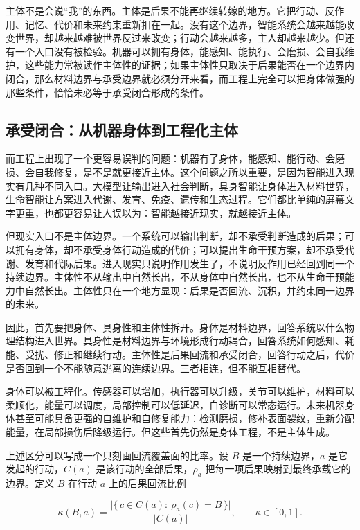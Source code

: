 主体不是会说“我”的东西。主体是后果不能再继续转嫁的地方。它把行动、反作用、记忆、代价和未来约束重新扣在一起。没有这个边界，智能系统会越来越能改变世界，却越来越难被世界反过来改变；行动会越来越多，主人却越来越少。但还有一个入口没有被检验。机器可以拥有身体，能感知、能执行、会磨损、会自我维护，这些能力常被读作主体性的证据；如果主体性只取决于后果能否在一个边界内闭合，那么材料边界与承受边界就必须分开来看，而工程上完全可以把身体做强的那些条件，恰恰未必等于承受闭合形成的条件。

\subsection{承受闭合：从机器身体到工程化主体}

而工程上出现了一个更容易误判的问题：机器有了身体，能感知、能行动、会磨损、会自我修复，是不是就更接近主体。这个问题之所以重要，是因为智能进入现实有几种不同入口。大模型让输出进入社会判断，具身智能让身体进入材料世界，生命智能让方案进入代谢、发育、免疫、遗传和生态过程。它们都比单纯的屏幕文字更重，也都更容易让人误以为：智能越接近现实，就越接近主体。


但现实入口不是主体边界。一个系统可以输出判断，却不承受判断造成的后果；可以拥有身体，却不承受身体行动造成的代价；可以提出生命干预方案，却不承受代谢、发育和代际后果。进入现实只说明作用发生了，不说明反作用已经回到同一个持续边界。主体性不从输出中自然长出，不从身体中自然长出，也不从生命干预能力中自然长出。主体性只在一个地方显现：后果是否回流、沉积，并约束同一边界的未来。

因此，首先要把身体、具身性和主体性拆开。身体是材料边界，回答系统以什么物理结构进入世界。具身性是材料边界与环境形成行动耦合，回答系统如何感知、耗能、受扰、修正和继续行动。主体性是后果回流和承受闭合，回答行动之后，代价是否回到一个不能随意逃离的连续边界。三者相连，但不能互相替代。

身体可以被工程化。传感器可以增加，执行器可以升级，关节可以维护，材料可以柔顺化，能量可以调度，局部控制可以低延迟，自诊断可以常态运行。未来机器身体甚至可能具备更强的自维护和自修复能力：检测磨损，修补表面裂纹，重新分配能量，在局部损伤后降级运行\cite{terryn2017self}。但这些首先仍然是身体工程，不是主体生成。

上述区分可以写成一个只刻画回流覆盖面的比率。设 $B$ 是一个持续边界，$a$ 是它发起的行动，$C(a)$ 是该行动的全部后果，$\rho_a$ 把每一项后果映射到最终承载它的边界。定义 $B$ 在行动 $a$ 上的后果回流比例

\begin{equation}
\kappa(B,a)=\frac{\bigl|\{\,c\in C(a):\ \rho_a(c)=B\,\}\bigr|}{\lvert C(a)\rvert},
\qquad \kappa\in[0,1].
\label{eq:ch33-closure}
\end{equation}


